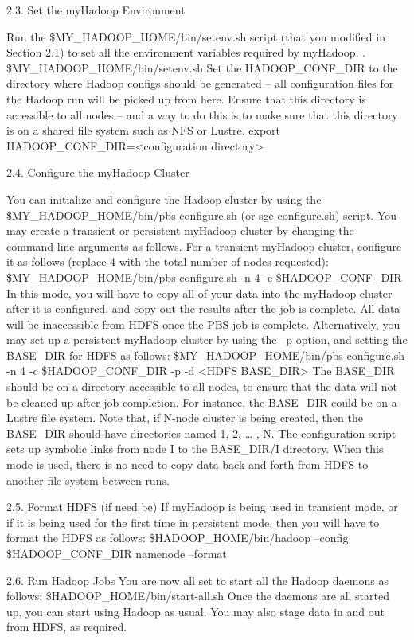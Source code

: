 \documentclass{article}
\begin{document}
2.3. Set the myHadoop Environment

Run the \$MY\_HADOOP\_HOME/bin/setenv.sh script (that you modified in Section 2.1)
to set all the environment variables required by myHadoop.
. \$MY\_HADOOP\_HOME/bin/setenv.sh
Set the HADOOP\_CONF\_DIR to the directory where Hadoop configs should be
generated – all configuration files for the Hadoop run will be picked up from here. Ensure
that this directory is accessible to all nodes – and a way to do this is to make sure that this
directory is on a shared file system such as NFS or Lustre.
export HADOOP\_CONF\_DIR=<configuration directory>

2.4. Configure the myHadoop Cluster

You can initialize and configure the Hadoop cluster by using the
\$MY\_HADOOP\_HOME/bin/pbs-configure.sh (or sge-configure.sh) script. You may
create a transient or persistent myHadoop cluster by changing the command-line
arguments as follows.
For a transient myHadoop cluster, configure it as follows (replace 4 with the total number
of nodes requested):
\$MY\_HADOOP\_HOME/bin/pbs-configure.sh -n 4 -c \$HADOOP\_CONF\_DIR
In this mode, you will have to copy all of your data into the myHadoop cluster after it is
configured, and copy out the results after the job is complete. All data will be
inaccessible from HDFS once the PBS job is complete.
Alternatively, you may set up a persistent myHadoop cluster by using the –p option, and
setting the BASE\_DIR for HDFS as follows:
\$MY\_HADOOP\_HOME/bin/pbs-configure.sh -n 4 -c \$HADOOP\_CONF\_DIR -p -d
<HDFS BASE\_DIR>
The BASE\_DIR should be on a directory accessible to all nodes, to ensure that the data
will not be cleaned up after job completion. For instance, the BASE\_DIR could be on a
Lustre file system. Note that, if N-node cluster is being created, then the BASE\_DIR
should have directories named 1, 2, … , N. The configuration script sets up symbolic
links from node I to the BASE\_DIR/I directory. When this mode is used, there is no need
to copy data back and forth from HDFS to another file system between runs.

2.5. Format HDFS (if need be)
If myHadoop is being used in transient mode, or if it is being used for the first time in
persistent mode, then you will have to format the HDFS as follows:
\$HADOOP\_HOME/bin/hadoop --config \$HADOOP\_CONF\_DIR namenode –format

2.6. Run Hadoop Jobs
You are now all set to start all the Hadoop daemons as follows:
\$HADOOP\_HOME/bin/start-all.sh
Once the daemons are all started up, you can start using Hadoop as usual. You may also
stage data in and out from HDFS, as required.
\end{document}
